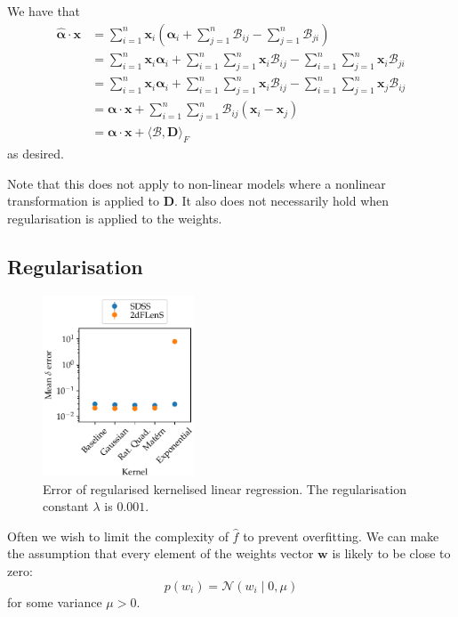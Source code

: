 \documentclass[11pt,twoside]{report}
\newcommand\bw{\mathbf{w}}
\newcommand\cN{\mathcal{N}}
\begin{document}
We have that\begin{align*}
    \hat{\bm{\alpha}} \cdot \mathbf{x} &= \sum_{i=1}^n \mathbf{x}_i\left( \bm{\alpha}_i + \sum_{j=1}^n \mathcal{B}_{ij} - \sum_{j=1}^n \mathcal{B}_{ji} \right) \\
    &= \sum_{i=1}^n \mathbf{x}_i\bm{\alpha}_i +  \sum_{i=1}^n \sum_{j=1}^n \mathbf{x}_i \mathcal{B}_{ij} - \sum_{i=1}^n \sum_{j=1}^n \mathbf{x}_i \mathcal{B}_{ji} \\
    &= \sum_{i=1}^n \mathbf{x}_i\bm{\alpha}_i +  \sum_{i=1}^n \sum_{j=1}^n \mathbf{x}_i \mathcal{B}_{ij} - \sum_{i=1}^n \sum_{j=1}^n \mathbf{x}_j \mathcal{B}_{ij} \\
    &= \bm{\alpha}\cdot\mathbf{x} +  \sum_{i=1}^n \sum_{j=1}^n \mathcal{B}_{ij} \left(\mathbf{x}_i - \mathbf{x}_j \right) \\
    &= \bm{\alpha}\cdot\mathbf{x} + \langle \mathcal{B}, \mathbf{D} \rangle_F
\end{align*} as desired.

Note that this does not apply to non-linear models where a nonlinear transformation is applied to $\mathbf{D}$. It also does not necessarily hold when regularisation is applied to the weights.

\subsection{Regularisation}

  \begin{figure}
    \centering
    \includegraphics[width=0.4\textwidth]{linreg_kernelised_regularised.pdf}
    \caption{Error of regularised kernelised linear regression. The regularisation constant $\lambda$ is $0.001$.}
    \label{fig:linreg_kernelised_regularised}
  \end{figure}

Often we wish to limit the complexity of $\hat f$ to prevent overfitting. We can make the assumption that every element of the weights vector $\bw$ is likely to be close to zero: \[
    p(w_i) = \cN(w_i \mid 0, \mu)
\] for some variance $\mu > 0$.
\end{document}
